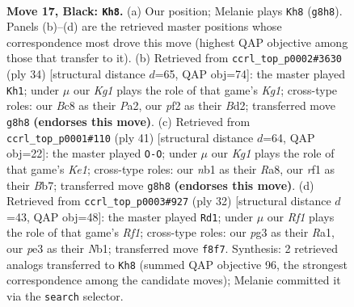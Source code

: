 \documentclass[11pt]{article}
\begin{document}
\begin{figure}[p]
\label{fig:thought-m31}
\end{figure}

\clearpage

\begin{figure}[p]\centering
\begin{subfigure}{0.46\textwidth}\centering
\resizebox{\linewidth}{!}{%
\newchessgame
\chessboard[
  setfen={r1b2rk1/pp4pp/n2b4/P2B1pNn/8/1P2P1P1/5P2/RNB2RK1 b - - 0 17},
  showmover=false,
  pgfstyle=straightmove, color=movearrow, markmove={g8-h8}
]}
\caption{}
\end{subfigure}\hfill
\begin{subfigure}{0.46\textwidth}\centering
\resizebox{\linewidth}{!}{%
\newchessgame
\chessboard[
  setfen={r1b4r/pp2kp2/n1pp3p/8/2Pb1P2/2N5/PP1BP1BP/R2R2K1 w - - 1 18},
  showmover=false,
  pgfstyle=straightmove, color=movearrow, markmove={g1-h1}
]}
\caption{}
\end{subfigure}
\\[4pt]
\begin{subfigure}{0.46\textwidth}\centering
\resizebox{\linewidth}{!}{%
\newchessgame
\chessboard[
  setfen={r3k2r/1b2bpp1/p3p3/1p5n/3B3p/2P4P/PPB2PP1/R3RNK1 b kq - 2 21},
  showmover=false,
  pgfstyle=straightmove, color=movearrow, markmove={e8-g8}
]}
\caption{}
\end{subfigure}\hfill
\begin{subfigure}{0.46\textwidth}\centering
\resizebox{\linewidth}{!}{%
\newchessgame
\chessboard[
  setfen={r1b2rk1/p4pp1/2p4p/3n4/2Bbp3/7P/PPP2PP1/RNB2RK1 w - - 1 17},
  showmover=false,
  pgfstyle=straightmove, color=movearrow, markmove={f1-d1}
]}
\caption{}
\end{subfigure}
\caption{\textbf{Move 17, Black: \texttt{Kh8}.} (a) Our position; Melanie plays \texttt{Kh8} (\texttt{g8h8}). Panels (b)--(d) are the retrieved master positions whose correspondence most drove this move (highest QAP objective among those that transfer to it). (b) Retrieved from \texttt{ccrl\_top\_p0002\#3630} (ply 34) [structural distance $d$=65, QAP obj=74]: the master played \texttt{Kh1}; under $\mu$ our \emph{Kg1} plays the role of that game's \emph{Kg1}; cross-type roles: our \emph{B}c8 as their \emph{P}a2, our \emph{p}f2 as their \emph{B}d2; transferred move \texttt{g8h8} \textbf{(endorses this move)}. (c) Retrieved from \texttt{ccrl\_top\_p0001\#110} (ply 41) [structural distance $d$=64, QAP obj=22]: the master played \texttt{O-O}; under $\mu$ our \emph{Kg1} plays the role of that game's \emph{Ke1}; cross-type roles: our \emph{n}b1 as their \emph{R}a8, our \emph{r}f1 as their \emph{B}b7; transferred move \texttt{g8h8} \textbf{(endorses this move)}. (d) Retrieved from \texttt{ccrl\_top\_p0003\#927} (ply 32) [structural distance $d$=43, QAP obj=48]: the master played \texttt{Rd1}; under $\mu$ our \emph{Rf1} plays the role of that game's \emph{Rf1}; cross-type roles: our \emph{p}g3 as their \emph{R}a1, our \emph{p}e3 as their \emph{N}b1; transferred move \texttt{f8f7}. Synthesis: 2 retrieved analogs transferred to \texttt{Kh8} (summed QAP objective 96, the strongest correspondence among the candidate moves); Melanie committed it via the \texttt{search} selector.}
\label{fig:thought-m33}
\end{figure}
\end{document}
